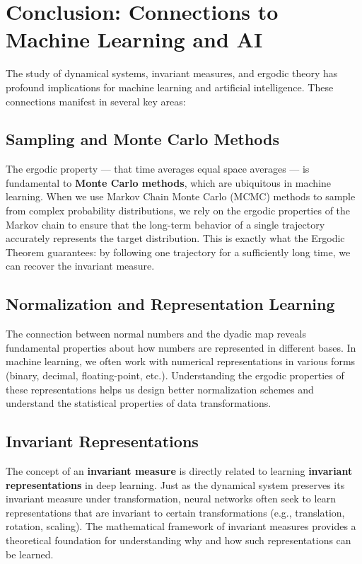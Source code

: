 \documentclass[12pt,a4paper]{article}
\begin{document}
\section{Conclusion: Connections to Machine Learning and AI}

The study of dynamical systems, invariant measures, and ergodic theory has profound implications for machine learning and artificial intelligence. These connections manifest in several key areas:

\subsection{Sampling and Monte Carlo Methods}

The ergodic property --- that time averages equal space averages --- is fundamental to \textbf{Monte Carlo methods}, which are ubiquitous in machine learning. When we use Markov Chain Monte Carlo (MCMC) methods to sample from complex probability distributions, we rely on the ergodic properties of the Markov chain to ensure that the long-term behavior of a single trajectory accurately represents the target distribution. This is exactly what the Ergodic Theorem guarantees: by following one trajectory for a sufficiently long time, we can recover the invariant measure.

\subsection{Normalization and Representation Learning}

The connection between normal numbers and the dyadic map reveals fundamental properties about how numbers are represented in different bases. In machine learning, we often work with numerical representations in various forms (binary, decimal, floating-point, etc.). Understanding the ergodic properties of these representations helps us design better normalization schemes and understand the statistical properties of data transformations.

\subsection{Invariant Representations}

The concept of an \textbf{invariant measure} is directly related to learning \textbf{invariant representations} in deep learning. Just as the dynamical system preserves its invariant measure under transformation, neural networks often seek to learn representations that are invariant to certain transformations (e.g., translation, rotation, scaling). The mathematical framework of invariant measures provides a theoretical foundation for understanding why and how such representations can be learned.
\end{document}
